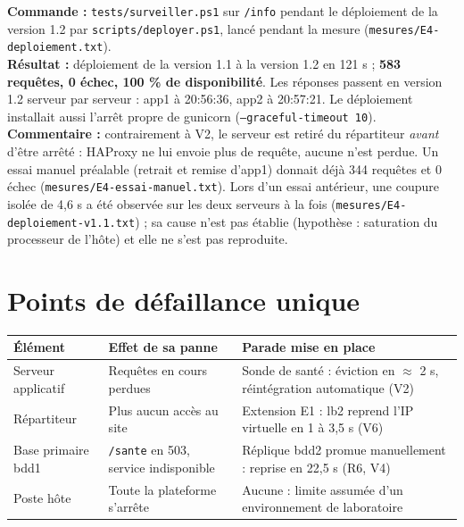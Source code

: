 \documentclass[11pt,a4paper,oneside]{report}
\newcommand{\cmd}[1]{\texttt{#1}}
\newcommand{\auteur}[1]{\par\noindent{\small\itshape Rédaction : #1}\par\medskip}
\begin{document}
	\textbf{Commande :} \cmd{tests/surveiller.ps1} sur \cmd{/info} pendant le déploiement de la
	version 1.2 par \cmd{scripts/deployer.ps1}, lancé pendant la mesure (\cmd{mesures/E4-deploiement.txt}).\\
	\textbf{Résultat :} déploiement de la version 1.1 à la version 1.2 en 121 s ; \textbf{583 requêtes,
		0 échec, 100 \% de disponibilité}. Les réponses passent en version 1.2 serveur par serveur :
	app1 à 20:56:36, app2 à 20:57:21. Le déploiement installait aussi l'arrêt propre de gunicorn
	(\cmd{--graceful-timeout 10}).\\
	\textbf{Commentaire :} contrairement à V2, le serveur est retiré du répartiteur \emph{avant}
	d'être arrêté : HAProxy ne lui envoie plus de requête, aucune n'est perdue. Un essai manuel
	préalable (retrait et remise d'app1) donnait déjà 344 requêtes et 0 échec
	(\cmd{mesures/E4-essai-manuel.txt}). Lors d'un essai antérieur, une coupure isolée de 4,6 s
	a été observée sur les deux serveurs à la fois (\cmd{mesures/E4-deploiement-v1.1.txt}) ; sa cause
	n'est pas établie (hypothèse : saturation du processeur de l'hôte) et elle ne s'est pas reproduite.
	
	\chapter{Points de défaillance unique}
	\auteur{Le groupe}
	
	\begin{longtable}{@{}p{} p{} p{}@{}}
		\toprule
		\textbf{Élément} & \textbf{Effet de sa panne} & \textbf{Parade mise en place} \\
		\midrule
		\endhead
		Serveur applicatif & Requêtes en cours perdues & Sonde de santé : éviction en $\approx$ 2 s, réintégration automatique (V2) \\
		\addlinespace
		Répartiteur & Plus aucun accès au site & Extension E1 : lb2 reprend l'IP virtuelle en 1 à 3,5 s (V6) \\
		\addlinespace
		Base primaire bdd1 & \cmd{/sante} en 503, service indisponible & Réplique bdd2 promue manuellement : reprise en 22,5 s (R6, V4) \\
		\addlinespace
		Poste hôte & Toute la plateforme s'arrête & Aucune : limite assumée d'un environnement de laboratoire \\
		\bottomrule
	\end{longtable}
	
\end{document}
